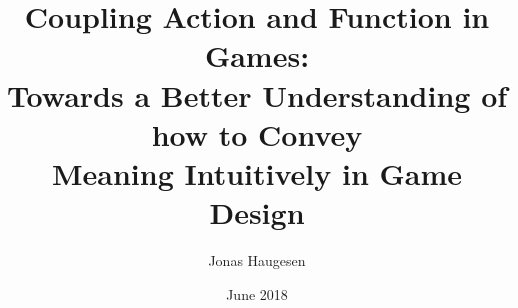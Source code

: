 \documentclass{masterthesis}
\title{%
  \Large Coupling Action and Function in Games: \\
  \large Towards a Better Understanding of how to Convey \\
    Meaning Intuitively in Game Design}
\author{Jonas Haugesen}
\date{June 2018}
\begin{document}
\maketitle
\makefrontmatter





\clearpage
\makebibliography

\begin{appendices}

\end{appendices}
\end{document}
